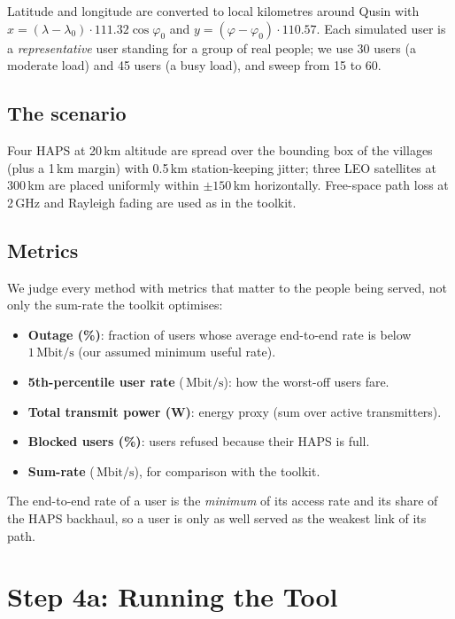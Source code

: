 \documentclass[11pt,a4paper]{article}
\newcommand{\Mbps}{\,\mathrm{Mbit/s}}
\begin{document}
Latitude and longitude are converted to local kilometres around Qusin with $x=(\lambda-\lambda_0)\cdot 111.32\cos\varphi_0$ and $y=(\varphi-\varphi_0)\cdot 110.57$. Each simulated user is a \emph{representative} user standing for a group of real people; we use 30 users (a moderate load) and 45 users (a busy load), and sweep from 15 to 60.

\subsection{The scenario}
Four HAPS at 20\,km altitude are spread over the bounding box of the villages (plus a 1\,km margin) with 0.5\,km station-keeping jitter; three LEO satellites at 300\,km are placed uniformly within $\pm150$\,km horizontally. Free-space path loss at 2\,GHz and Rayleigh fading are used as in the toolkit.

\subsection{Metrics}
We judge every method with metrics that matter to the people being served, not only the sum-rate the toolkit optimises:
\begin{itemize}
  \item \textbf{Outage (\%)}: fraction of users whose average end-to-end rate is below $1\Mbps$ (our assumed minimum useful rate).
  \item \textbf{5th-percentile user rate} ($\Mbps$): how the worst-off users fare.
  \item \textbf{Total transmit power (W)}: energy proxy (sum over active transmitters).
  \item \textbf{Blocked users (\%)}: users refused because their HAPS is full.
  \item \textbf{Sum-rate} ($\Mbps$), for comparison with the toolkit.
\end{itemize}
The end-to-end rate of a user is the \emph{minimum} of its access rate and its share of the HAPS backhaul, so a user is only as well served as the weakest link of its path.

\section{Step 4a: Running the Tool}
\label{sec:run}
\end{document}
